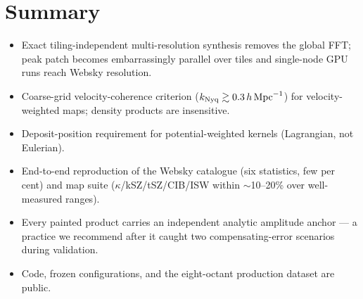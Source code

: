 \section{Summary}
\label{sec:summary}

\begin{itemize}
  \item Exact tiling-independent multi-resolution synthesis removes the
  global FFT; peak patch becomes embarrassingly parallel over tiles and
  single-node GPU runs reach Websky resolution.
  \item Coarse-grid velocity-coherence criterion
  ($k_{\rm Nyq}\gtrsim0.3\,h\,{\rm Mpc}^{-1}$) for velocity-weighted maps;
  density products are insensitive.
  \item Deposit-position requirement for potential-weighted kernels
  (Lagrangian, not Eulerian).
  \item End-to-end reproduction of the Websky catalogue (six statistics,
  few per cent) and map suite ($\kappa$/kSZ/tSZ/CIB/ISW within
  $\sim$10--20\% over well-measured ranges).
  \item Every painted product carries an independent analytic amplitude
  anchor --- a practice we recommend after it caught two
  compensating-error scenarios during validation.
  \item Code, frozen configurations, and the eight-octant production
  dataset are public. 
\end{itemize}
